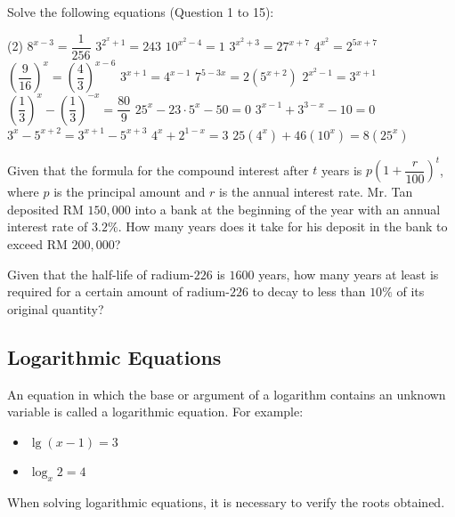 \documentclass{report}
\begin{document}
        Solve the following equations (Question 1 to 15):
        \begin{tasks}[label=\arabic*.](2)
            \task $8^{x-3}=\dfrac{1}{256}$
            \task $3^{2^x+1}=243$
            \task $10^{x^2-4}=1$
            \task $3^{x^2+3}=27^{x+7}$
            \task $4^{x^2}=2^{5 x+7}$
            \task $\left(\dfrac{9}{16}\right)^x=\left(\dfrac{4}{3}\right)^{x-6}$
            \task $3^{x+1}=4^{x-1}$
            \task $7^{5-3 x}=2\left(5^{x+2}\right)$
            \task $2^{x^2-1}=3^{x+1}$
            \task  $\left(\dfrac{1}{3}\right)^x-\left(\dfrac{1}{3}\right)^{-x}=\dfrac{80}{9}$
            \task $25^x-23 \cdot 5^x-50=0$
            \task $3^{x-1}+3^{3-x}-10=0$
            \task $3^x-5^{x+2}=3^{x+1}-5^{x+3}$
            \task $4^x+2^{1-x}=3$
            \task $25\left(4^x\right)+46\left(10^x\right)=8\left(25^x\right)$
        \end{tasks}
        \begin{tasks}[label=\arabic*, resume]
            \task Given that the formula for the compound interest after \( t \) years is \( p\left(1+\dfrac{r}{100}\right)^t \), where \( p \) is the principal amount and \( r \) is the annual interest rate. Mr. Tan deposited RM $150,000$ into a bank at the beginning of the year with an annual interest rate of \( 3.2\% \). How many years does it take for his deposit in the bank to exceed RM $200,000$?

            \task Given that the half-life of radium-$226$ is $1600$ years, how many years at least is required for a certain amount of radium-$226$ to decay to less than \( 10\% \) of its original quantity?
        \end{tasks}

        \subsection*{Logarithmic Equations}

        An equation in which the base or argument of a logarithm contains an unknown variable is called a logarithmic equation. For example:
        \vspace{-1em}
        \begin{itemize}
            \item $\lg (x-1)=3$
            \item $\log _x 2=4$
        \end{itemize}
        
        \vspace{-1em}
        When solving logarithmic equations, it is necessary to verify the roots obtained.
\end{document}
